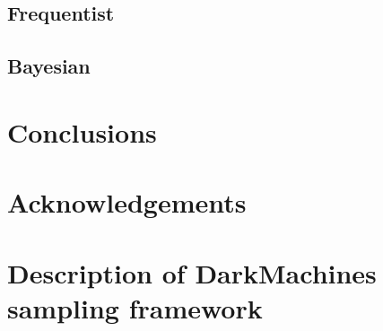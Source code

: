 \documentclass[12pt]{JHEP3}
\begin{document}
\subsection{Frequentist}
\subsection{Bayesian}

\section{Conclusions}\label{Conclusions}
\label{sec:conclusions}
\section{Acknowledgements}



\appendix
\section{Description of DarkMachines sampling framework}
\label{app:python}
\end{document}
